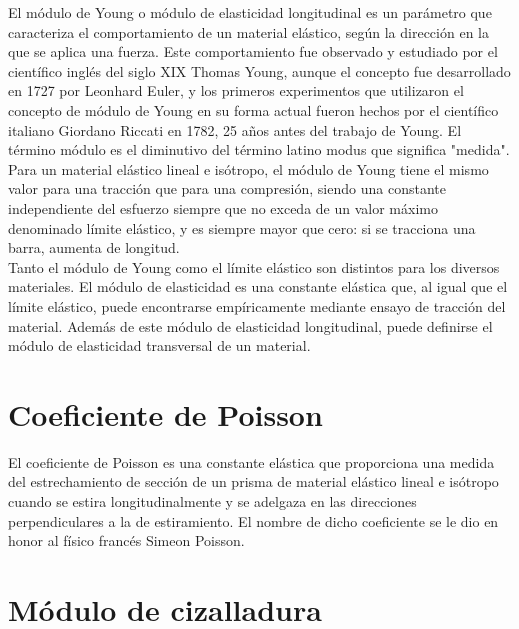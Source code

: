\documentclass[11pt,a4paper,oldfontcommands,oneside]{memoir}
\begin{document}
\begin{flushleft}

El módulo de Young o módulo de elasticidad longitudinal es un parámetro que caracteriza el comportamiento de un material elástico, según la dirección en la que se aplica una fuerza. Este comportamiento fue observado y estudiado por el científico inglés del siglo XIX Thomas Young, aunque el concepto fue desarrollado en 1727 por Leonhard Euler, y los primeros experimentos que utilizaron el concepto de módulo de Young en su forma actual fueron hechos por el científico italiano Giordano Riccati en 1782, 25 años antes del trabajo de Young. El término módulo es el diminutivo del término latino modus que significa "medida".\\
 
Para un material elástico lineal e isótropo, el módulo de Young tiene el mismo valor para una tracción que para una compresión, siendo una constante independiente del esfuerzo siempre que no exceda de un valor máximo denominado límite elástico, y es siempre mayor que cero: si se tracciona una barra, aumenta de longitud. \\

Tanto el módulo de Young como el límite elástico son distintos para los diversos materiales. El módulo de elasticidad es una constante elástica que, al igual que el límite elástico, puede encontrarse empíricamente mediante ensayo de tracción del material. Además de este módulo de elasticidad longitudinal, puede definirse el módulo de elasticidad transversal de un material.

\end{flushleft}

\chapter{Coeficiente de Poisson}

\begin{flushleft}

El coeficiente de Poisson es una constante elástica que proporciona una medida del estrechamiento de sección de un prisma de material elástico lineal e isótropo cuando se estira longitudinalmente y se adelgaza en las direcciones perpendiculares a la de estiramiento. El nombre de dicho coeficiente se le dio en honor al físico francés Simeon Poisson. 

\end{flushleft}

\chapter{Módulo de cizalladura}
\end{document}
